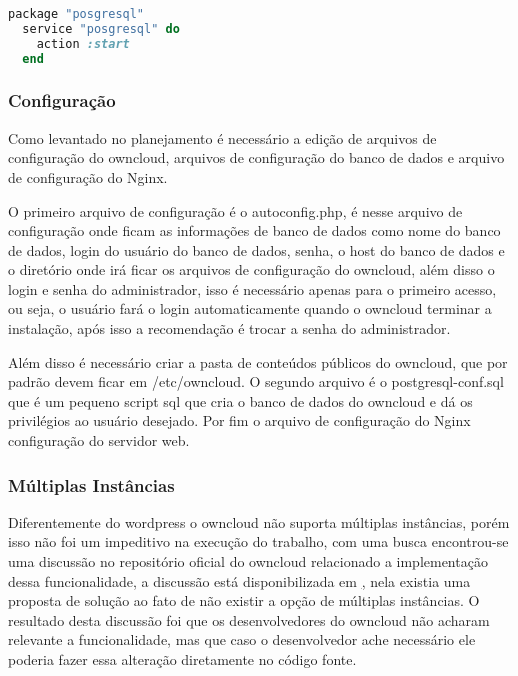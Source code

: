 \begin{lstlisting}[language=Ruby,label=dice_index,caption={Exemplo de como habilitar serviço do postgresql com chef}]
  package "posgresql"
  service "posgresql" do
    action :start
  end
\end{lstlisting}

\subsubsection{Configuração}

Como levantado no planejamento é necessário a edição de arquivos de configuração
do owncloud, arquivos de configuração do banco de dados e arquivo de configuração
do Nginx.

O primeiro arquivo de configuração é o autoconfig.php, é nesse arquivo de
configuração onde ficam as informações de banco de dados como nome do banco de dados,
login do usuário do banco de dados, senha, o host do banco de dados e o diretório
onde irá ficar os arquivos de configuração do owncloud, além disso o login e senha
do administrador, isso é necessário apenas para o primeiro acesso, ou seja, o usuário
fará o login automaticamente quando o owncloud terminar a instalação, após isso
a recomendação é trocar a senha do administrador.

Além disso é necessário criar a pasta de conteúdos públicos do owncloud, que por
padrão devem ficar em /etc/owncloud. O segundo arquivo é o postgresql-conf.sql
que é um pequeno script sql que cria o banco de dados do owncloud e dá os
privilégios ao usuário desejado. Por fim o arquivo de configuração do Nginx
configuração do servidor web.

\subsubsection{Múltiplas Instâncias}

Diferentemente do wordpress o owncloud não suporta múltiplas instâncias, porém isso
não foi um impeditivo na execução do trabalho, com uma busca encontrou-se uma discussão no repositório
oficial do owncloud relacionado a implementação dessa funcionalidade, a discussão está
disponibilizada em \href{https://github.com/owncloud/core/pull/16424}, nela existia
uma proposta de solução ao fato de não existir a opção de múltiplas instâncias. O
resultado desta discussão foi que os desenvolvedores do owncloud não acharam relevante
a funcionalidade, mas que caso o desenvolvedor ache necessário ele poderia fazer essa
alteração diretamente no código fonte.

